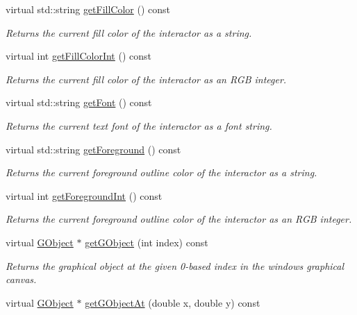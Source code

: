 \begin{DoxyCompactItemize}
virtual std\+::string \mbox{\hyperlink{classGDrawingSurface_a76f6964a11fde7c78e9751be184e1a3c}{get\+Fill\+Color}} () const
\begin{DoxyCompactList}\small\item\em Returns the current fill color of the interactor as a string. \end{DoxyCompactList}\item 
virtual int \mbox{\hyperlink{classGDrawingSurface_a88f4508d9271c4b5f5b5d6b780f223d0}{get\+Fill\+Color\+Int}} () const
\begin{DoxyCompactList}\small\item\em Returns the current fill color of the interactor as an R\+GB integer. \end{DoxyCompactList}\item 
virtual std\+::string \mbox{\hyperlink{classGDrawingSurface_a894a5502900794eeb27d084c21f1d77d}{get\+Font}} () const
\begin{DoxyCompactList}\small\item\em Returns the current text font of the interactor as a font string. \end{DoxyCompactList}\item 
virtual std\+::string \mbox{\hyperlink{classGDrawingSurface_a4fa2d8b0192a3a5b4af4bbfe71194d03}{get\+Foreground}} () const
\begin{DoxyCompactList}\small\item\em Returns the current foreground outline color of the interactor as a string. \end{DoxyCompactList}\item 
virtual int \mbox{\hyperlink{classGDrawingSurface_ac3b12ab385a6ef9ae90fc879860ba726}{get\+Foreground\+Int}} () const
\begin{DoxyCompactList}\small\item\em Returns the current foreground outline color of the interactor as an R\+GB integer. \end{DoxyCompactList}\item 
virtual \mbox{\hyperlink{classGObject}{G\+Object}} $\ast$ \mbox{\hyperlink{classGWindow_adf27adaeeb8b551424b2096a20285fde}{get\+G\+Object}} (int index) const
\begin{DoxyCompactList}\small\item\em Returns the graphical object at the given 0-\/based index in the window\textquotesingle{}s graphical canvas. \end{DoxyCompactList}\item 
virtual \mbox{\hyperlink{classGObject}{G\+Object}} $\ast$ \mbox{\hyperlink{classGWindow_ab174a229ac7a3e9a4cd135d68dcf0076}{get\+G\+Object\+At}} (double x, double y) const

\end{DoxyCompactItemize}

